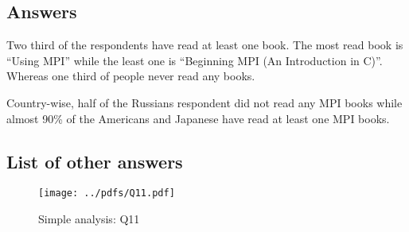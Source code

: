 
\subsection{Answers}


Two third of the respondents have read at least one book. The most
read book is ``Using MPI'' while the least one is ``Beginning MPI (An
Introduction in C)''. Whereas one third of people never read any books. 

Country-wise, half of the Russians respondent did not read any MPI
books while almost 90\% of the Americans and Japanese have read at
least one MPI books. 

\subsection{List of other answers}
\begin{itemize}

\end{itemize}

\begin{figure}[htb]
\begin{center}
\texttt{[image: ../pdfs/Q11.pdf]}
\caption{Simple analysis: Q11}
\label{fig:Q11}
\end{center}
\end{figure}


